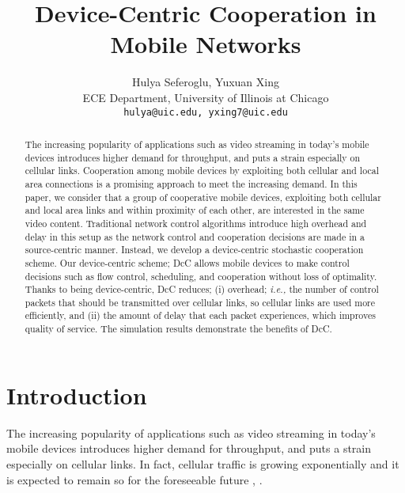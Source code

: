\documentclass[conference]{IEEEtran}
\newcommand{\ie}{{\em i.e., }}
\begin{document}
\title{Device-Centric Cooperation in Mobile Networks}

\author{Hulya Seferoglu, Yuxuan Xing\\
{\small ECE Department, University of Illinois at Chicago}\\
{ \small \tt hulya@uic.edu, yxing7@uic.edu}
}


\maketitle

\begin{abstract}

The increasing popularity of applications such as video streaming in today's mobile devices introduces higher demand for throughput, and puts a strain especially on cellular links. Cooperation among mobile devices by exploiting both cellular and local area connections is a promising approach to meet the increasing demand. In this paper, we consider that a group of cooperative mobile devices, exploiting both cellular and local area links and within proximity of each other, are interested in the same video content. Traditional network control algorithms introduce high overhead and delay in this setup as the network control and cooperation decisions are made in a source-centric manner. Instead, we develop a device-centric stochastic cooperation scheme. Our device-centric scheme; DcC allows mobile devices to make control decisions such as flow control, scheduling, and cooperation without loss of optimality. Thanks to being device-centric, DcC reduces; (i) overhead; \ie the number of control packets that should be transmitted over cellular links, so cellular links are used more efficiently, and (ii) the amount of delay that each packet experiences, which improves quality of service. The simulation results demonstrate the benefits of DcC.

\end{abstract}


\section{\label{sec:intro}Introduction}
The increasing popularity of applications such as video streaming in today's mobile devices introduces higher demand for throughput, and puts a strain especially on cellular links. In fact, cellular traffic is growing exponentially and it is expected to remain so for the foreseeable future \cite{cisco_index}, \cite{ericsson_report}.
\end{document}
